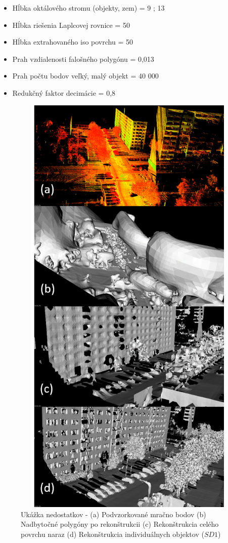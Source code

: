 \begin{itemize}
  \setlength\itemsep{0.2em}
  \item Hĺbka oktálového stromu (objekty, zem) = 9 ; 13
  \item Hĺbka riešenia Laplcovej rovnice = 50
  \item Hĺbka extrahovaného iso povrchu = 50
  \item Prah vzdialenosti falošného polygónu = 0,013
  \item Prah počtu bodov veľký, malý objekt = 40 000
  \item Redukčný faktor decimácie = 0,8
\end{itemize}

\begin{figure}[!htbp]
  \centering
  \includegraphics[width=14.5cm, height=21cm]{img/mesh_bad_polygons.png}
  \caption{Ukážka nedostatkov - (a) Podvzorkované mračno bodov (b) Nadbytočné polygóny po rekonštrukcii (c) Rekonštrukcia celého povrchu naraz (d) Rekonštrukcia individuálnych objektov ($SD1$)} 
  \label{fig:mesh_bad_polygons}
\end{figure} 

